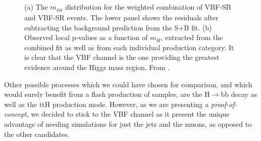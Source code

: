 \begin{figure}
    \myfloatalign
     \quad
     \\
    \caption[H$\rightarrow\mu^+\mu^-$]{(a) The $m_{\mu\mu}$ distribution for the weighted combination of VBF-SB and VBF-SR events. The lower panel shows the residuals after subtracting the background prediction from the S+B fit. (b) Observed local p-values as a function of $m_H$, extracted from the combined fit as well as from each individual production category. It is clear that the VBF channel is the one providing the greatest evidence around the Higgs mass region. From \cite{Sirunyan_2021}.}\label{fig:vbfmm}
    
\end{figure}

Other possible processes which we could have chosen for comparison, and which would surely benefit from a flash production of samples, are the H$\rightarrow$bb decay as well as the ttH production mode. However, as we are presenting a \emph{proof-of-concept}, we decided to stick to the VBF channel as it present the unique advantage of needing simulations for just the jets and the muons, as opposed to the other candidates. 